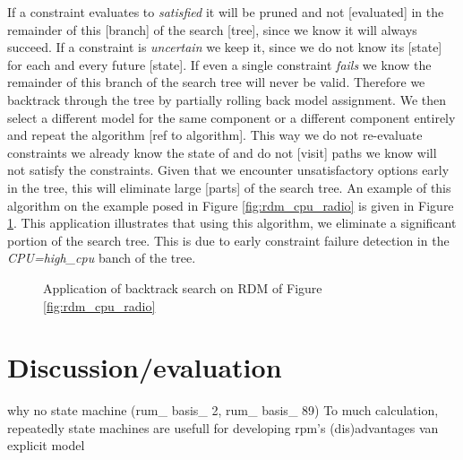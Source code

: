 If a constraint evaluates to \emph{satisfied} it will be pruned and not [evaluated] in the remainder of this [branch] of the search [tree], since we know it will always succeed. If a constraint is \emph{uncertain} we keep it, since we do not know its [state] for each and every future [state]. If even a single constraint \emph{fails} we know the remainder of this branch of the search tree will never be valid. Therefore we backtrack through the tree by partially rolling back model assignment. We then select a different model for the same component or a different component entirely and repeat the algorithm [ref to algorithm]. This way we do not re-evaluate constraints we already know the state of and do not [visit] paths we know will not satisfy the constraints. Given that we encounter unsatisfactory options early in the tree, this will eliminate large [parts] of the search tree. An example of this algorithm on the example posed in Figure \ref{fig:rdm_cpu_radio} is given in Figure \ref{fig:search_cpu_radio}. This application illustrates that using this algorithm, we eliminate a significant portion of the search tree. This is due to early constraint failure detection in the \emph{CPU=high\_cpu} banch of the tree.
\begin{figure}

\label{fig:search_cpu_radio}
\caption{Application of backtrack search on RDM of Figure \ref{fig:rdm_cpu_radio}}
\end{figure}

\section{Discussion/evaluation}
why no state machine (rum\_ basis\_ 2, rum\_ basis\_ 89) To much calculation, repeatedly
	state machines are usefull for developing rpm's
(dis)advantages van explicit model

	









